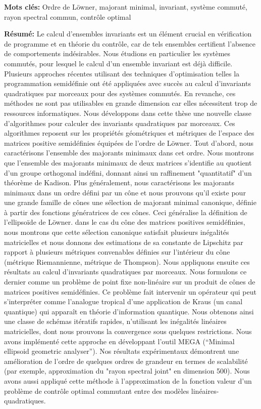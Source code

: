\documentclass[a4paper]{article}
\begin{document}
\begin{center}
{{{\bf Mots clés:} Ordre de L\"owner, majorant minimal, invariant, syst\`eme commut\'e, rayon spectral commun, contrôle optimal
\vspace{-2mm}
\begin{multicols}{2}
{\bf Résumé:} 
\small
Le calcul d'ensembles invariants est un élément crucial en vérification de programme et en théorie du contrôle, car de tels ensembles certifient l'absence de comportements indésirables. Nous étudions en particulier les systèmes commutés, pour lesquel le calcul d'un ensemble invariant est déjà difficile. Plusieurs approches récentes utilisant des techniques d'optimisation telles la programmation semidéfinie ont été appliquées avec succès au calcul d'invariants quadratiques par morceaux pour des systèmes commutés. En revanche, ces méthodes ne sont pas utilisables en grande dimension car elles nécessitent trop de ressources informatiques.
Nous développons dans cette thèse une nouvelle classe d'algorithmes pour calculer des invariants quadratiques par morceaux. Ces algorithmes reposent sur les propriétés géométriques et métriques de l'espace des matrices positive semidéfinies équipées de l'ordre de Löwner.
Tout d'abord, nous caractérisons l'ensemble des majorants minimaux dans cet ordre. Nous montrons que l'ensemble des majorants minimaux de deux matrices s'identifie au quotient d'un groupe orthogonal indéfini, donnant ainsi un raffinement "quantitatif" d'un théorème de Kadison. Plus généralement, nous caractérisons les majorants minimaux dans un ordre défini par un cône et nous prouvons qu'il existe pour une grande famille de cônes une sélection de majorant minimal canonique, définie à partir des fonctions génératrices de ces cônes. Ceci généralise la définition de l'ellipsoïde de Löwner. dans le cas du cône des matrices positives semidéfinies, nous montrons que cette sélection canonique satisfait plusieurs inégalités matricielles et nous donnons des estimations de sa constante de Lipschitz par rapport à plusieurs métriques convenables définies sur l'intérieur du cône (métrique Riemannienne, métrique de Thompson).
Nous appliquons ensuite ces résultats au calcul d'invariants quadratiques par morceaux. Nous formulons ce dernier comme un problème de point fixe non-linéaire sur un produit de cônes de matrices positives semidéfinies. Ce problème fait intervenir un opérateur qui peut s'interpréter comme l'analogue tropical d'une application de Kraus (un canal quantique) qui apparaît en théorie d'information quantique. Nous obtenons ainsi une classe de schémas itératifs rapides, n'utilisant les inégalités linéaires matricielles, dont nous prouvons la convergence sous quelques restrictions. Nous avons implémenté cette approche en développant l'outil MEGA (``Minimal ellipsoid geometric
analyser''). Nos résultats expérimentaux démontrent une amélioration de l'ordre de quelques ordres de grandeur en termes de scalabilité (par exemple, approximation du "rayon spectral joint" en dimension 500). Nous avons aussi appliqué cette méthode à l'approximation de la fonction valeur d'un problème de contrôle optimal commutant entre des modèles linéaires-quadratiques.
\end{multicols}
}}
\end{center}
\end{document}
